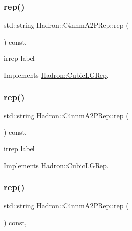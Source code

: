\subsubsection{\texorpdfstring{rep()}{rep()}\hspace{0.1cm}{\footnotesize\ttfamily [1/3]}}
{\footnotesize\ttfamily std\+::string Hadron\+::\+C4nnm\+A2\+P\+Rep\+::rep (\begin{DoxyParamCaption}{ }\end{DoxyParamCaption}) const\hspace{0.3cm}{\ttfamily [inline]}, {\ttfamily [virtual]}}

irrep label 

Implements \mbox{\hyperlink{structHadron_1_1CubicLGRep_a50f5ddbb8f4be4cee0106fa9e8c75e6c}{Hadron\+::\+Cubic\+L\+G\+Rep}}.

\mbox{\label{structHadron_1_1C4nnmA2PRep_ab36717b439585aa0134698e1fa6802b2}} 
\subsubsection{\texorpdfstring{rep()}{rep()}\hspace{0.1cm}{\footnotesize\ttfamily [2/3]}}
{\footnotesize\ttfamily std\+::string Hadron\+::\+C4nnm\+A2\+P\+Rep\+::rep (\begin{DoxyParamCaption}{ }\end{DoxyParamCaption}) const\hspace{0.3cm}{\ttfamily [inline]}, {\ttfamily [virtual]}}

irrep label 

Implements \mbox{\hyperlink{structHadron_1_1CubicLGRep_a50f5ddbb8f4be4cee0106fa9e8c75e6c}{Hadron\+::\+Cubic\+L\+G\+Rep}}.

\mbox{\label{structHadron_1_1C4nnmA2PRep_ab36717b439585aa0134698e1fa6802b2}} 
\subsubsection{\texorpdfstring{rep()}{rep()}\hspace{0.1cm}{\footnotesize\ttfamily [3/3]}}
{\footnotesize\ttfamily std\+::string Hadron\+::\+C4nnm\+A2\+P\+Rep\+::rep (\begin{DoxyParamCaption}{ }\end{DoxyParamCaption}) const\hspace{0.3cm}{\ttfamily [inline]}, {\ttfamily [virtual]}}


